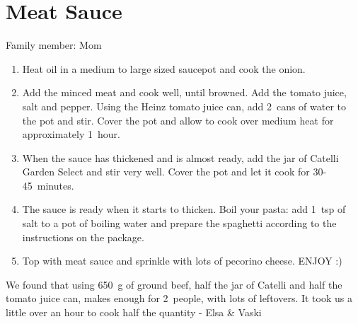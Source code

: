 \chapter{Meat Sauce}
\label{ch:meatsauce}


Family member: Mom

\begin{enumerate}
    \item Heat oil in a medium to large sized saucepot and cook the onion.
    \item Add the minced meat and cook well, until browned. Add the tomato juice, salt and pepper. Using the Heinz tomato juice can, add 2~cans of water to the pot and stir. Cover the pot and allow to cook over medium heat for approximately 1~hour.
    \item When the sauce has thickened and is almost ready, add the jar of Catelli Garden Select and stir very well. Cover the pot and let it cook for 30-45~minutes.
    \item The sauce is ready when it starts to thicken. Boil your pasta: add 1~tsp of salt to a pot of boiling water and prepare the spaghetti according to the instructions on the package.
    \item Top with meat sauce and sprinkle with lots of pecorino cheese. ENJOY :)
\end{enumerate}

We found that using 650~g of ground beef, half the jar of Catelli and half the tomato juice can, makes enough for 2~people, with lots of leftovers. It took us a little over an hour to cook half the quantity - Elsa \& Vaski

